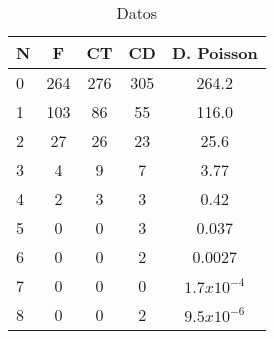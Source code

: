 \begin{table}[!ht]
\begin{center}
\begin{tabular}{|l|c|c|c|c|} \hline 

N & F & CT & CD & D. Poisson\\ \hline
0 & 264 & 276 & 305 & 264.2 \\ \hline
1 & 103 & 86 & 55 & 116.0 \\ \hline
2 & 27 & 26 & 23 & 25.6 \\ \hline
3 & 4 & 9 & 7 & 3.77 \\ \hline
4 & 2 & 3 & 3 & 0.42 \\ \hline
5 & 0 & 0 & 3 & 0.037 \\ \hline
6 & 0 & 0 & 2 & 0.0027 \\ \hline
7 & 0 & 0 & 0 & $1.7x10^{-4}$\\ \hline
8 & 0 & 0 & 2 & $9.5x10^{-6}$ \\ \hline

\end{tabular}
\end{center}
\caption{Datos}
\label{tabla1}
\end{table}

